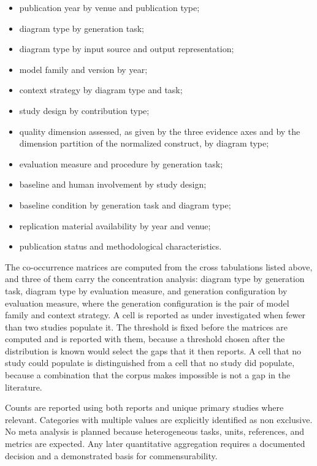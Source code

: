 \begin{itemize}
    \item publication year by venue and publication type;
    \item diagram type by generation task;
    \item diagram type by input source and output representation;
    \item model family and version by year;
    \item context strategy by diagram type and task;
    \item study design by contribution type;
    \item quality dimension assessed, as given by the three evidence axes and by the dimension partition of the normalized construct, by diagram type;
    \item evaluation measure and procedure by generation task;
    \item baseline and human involvement by study design;
    \item baseline condition by generation task and diagram type;
    \item replication material availability by year and venue;
    \item publication status and methodological characteristics.
\end{itemize}

The co-occurrence matrices are computed from the cross tabulations listed above, and three of them carry the concentration analysis: diagram type by generation task, diagram type by evaluation measure, and generation configuration by evaluation measure, where the generation configuration is the pair of model family and context strategy. A cell is reported as under investigated when fewer than two studies populate it. The threshold is fixed before the matrices are computed and is reported with them, because a threshold chosen after the distribution is known would select the gaps that it then reports. A cell that no study could populate is distinguished from a cell that no study did populate, because a combination that the corpus makes impossible is not a gap in the literature.

Counts are reported using both reports and unique primary studies where relevant. Categories with multiple values are explicitly identified as non exclusive. No meta analysis is planned because heterogeneous tasks, units, references, and metrics are expected. Any later quantitative aggregation requires a documented decision and a demonstrated basis for commensurability.

